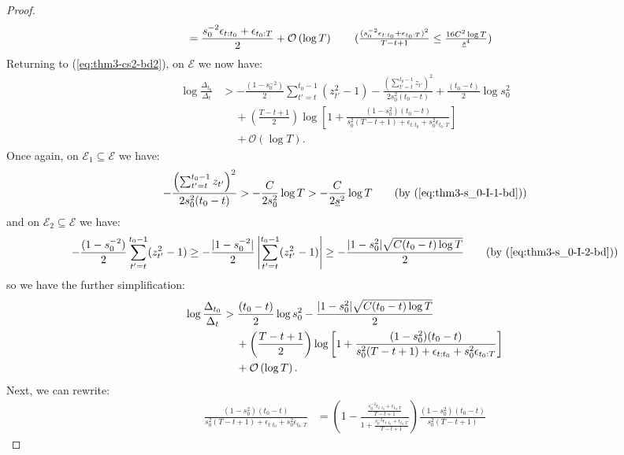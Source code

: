 \begin{proof}
\begin{align*}
    &= \frac{s_0^{-2}\epsilon_{t:t_0} + \epsilon_{t_0:T}}{2} + \mathcal{O}\left(\log T\right) \tag{$\frac{(s_0^{-2} \epsilon_{t:t_0} + \epsilon_{t_0:T})^2}{T-t+1} \leq \frac{16C^2\log T}{\underline{s}^{4}}$}
\end{align*}
Returning to (\ref{eq:thm3-cs2-bd2}), on $\mathcal{E}$ we now have:
\begin{align*}
    \log \frac{\Delta_{t_0}}{\Delta_t} &> - \frac{(1-s_0^{-2})}{2} \sum_{t' = t}^{t_0 - 1} (z_{t'}^2-1) - \frac{\left(\sum_{t'=t}^{t_0-1 } z_{t'}\right)^2}{2s_0^2(t_0-t)} + \frac{(t_0-t)}{2}\log s_0^2  \\
    &\quad\: + \left(\frac{T - t +1}{2}\right)\log\left[1 + \frac{(1 - s_0^2)(t_0 - t)}{s_0^{2}(T-t+1) + \epsilon_{t:t_0} + s_0^{2}\epsilon_{t_0:T} }\right]  \\
    &\quad\: +\mathcal{O}\left(\log T\right). 
\end{align*}
Once again, on $\mathcal{E}_1 \subseteq \mathcal{E}$ we have:
\begin{align*}
    - \frac{\left(\sum_{t'=t}^{t_0-1 } z_{t'}\right)^2}{2s_0^2(t_0-t)} > - \frac{C}{2s_0^2} \log T > - \frac{C}{2\underline{s}^2} \log T \tag{by (\ref{eq:thm3-s_0-I-1-bd})}
\end{align*}
and on $\mathcal{E}_2 \subseteq \mathcal{E}$ we have: 
\begin{align*}
    - \frac{(1-s_0^{-2})}{2} \sum_{t' = t}^{t_0 - 1} (z_{t'}^2-1) \geq - \frac{|1-s_0^{-2}|}{2} \left|\sum_{t' = t}^{t_0 - 1} (z_{t'}^2-1)\right| \geq - \frac{|1 - s_0^2|\sqrt{C(t_0-t)\log T}}{2} \tag{by (\ref{eq:thm3-s_0-I-2-bd})}
\end{align*}
so we have the further simplification:
\begin{align*}
    \log \frac{\Delta_{t_0}}{\Delta_t} &> \frac{(t_0-t)}{2}\log s_0^2  - \frac{|1 - s_0^2|\sqrt{C(t_0-t)\log T}}{2} \notag \\
    &\quad\: + \left(\frac{T - t +1}{2}\right)\log\left[1 + \frac{(1 - s_0^2)(t_0 - t)}{s_0^{2}(T-t+1) + \epsilon_{t:t_0} + s_0^{2}\epsilon_{t_0:T} }\right] \notag \\
    &\quad\: + \mathcal{O}\left(\log T\right). 
\end{align*}
Next, we can rewrite:
\begin{align*}
    \frac{(1 - s_0^2)(t_0 - t)}{s_0^{2}(T-t+1) + \epsilon_{t:t_0} + s_0^{2}\epsilon_{t_0:T}} &= \left(1 - \frac{\frac{s_0^{-2}\epsilon_{t:t_0} + \epsilon_{t_0:T}}{T-t+1}}{1 + \frac{s_0^{-2}\epsilon_{t:t_0} + \epsilon_{t_0:T}}{T-t+1}}\right)\frac{(1 - s_0^2)(t_0 - t)}{s_0^{2}(T-t+1)}
\end{align*}

\end{proof}
